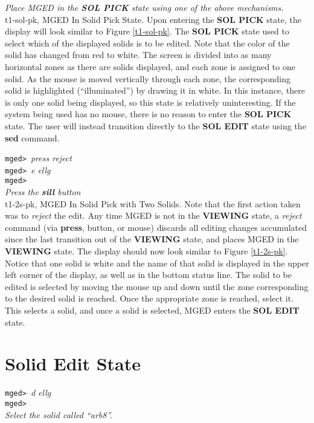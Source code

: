 \noindent
{\em Place MGED in the {\bf SOL PICK} state using one of the
above mechanisms.}\\

\mfig t1-sol-pk, MGED In Solid Pick State.
Upon entering the {\bf SOL PICK} state, the display will look similar to
Figure \ref{t1-sol-pk}.  The {\bf SOL PICK} state used to select which
of the displayed solids is to be edited.  Note that the color of the
solid has changed from red to white.  The screen is divided into as many
horizontal zones as there are solids displayed, and each zone is
assigned to one solid.  As the mouse is moved vertically through each
zone, the corresponding solid is highlighted (``illuminated'') by
drawing it in white.   In this instance, there is only one solid being
displayed, so this state is relatively uninteresting.
If the system being used has no mouse, there is no reason to enter the
{\bf SOL PICK} state.  The user will instead transition directly to
the {\bf SOL EDIT} state using the {\bf sed} command.

\noindent
{\tt mged> }{\em press reject}\\
{\tt mged> }{\em e ellg}\\
{\tt mged> }\\
{\em Press the {\bf sill} button}\\

\mfig t1-2s-pk, MGED In Solid Pick with Two Solids.
Note that the first action taken was to {\sl reject} the edit.  Any time MGED
is not in the {\bf VIEWING} state, a {\sl reject} command (via
{\bf press}, button, or mouse) discards all editing changes accumulated
since the last transition out of the {\bf VIEWING} state, and places
MGED in the {\bf VIEWING} state.
The display should now look similar to Figure \ref{t1-2s-pk}.
Notice that one solid is white and
the name of that solid is displayed in the upper left corner of the
display, as well as in the bottom status line. The solid to be edited is
selected by moving the mouse up and down until the zone corresponding to
the desired solid is reached. Once the appropriate zone is reached, select it.
This selects a solid, and once a solid is selected,
MGED enters the {\bf SOL EDIT} state.

\section{Solid Edit State}

\noindent
{\tt mged> }{\em d ellg}\\
{\tt mged> }\\
{\em Select the solid called ``arb8''.}\\

